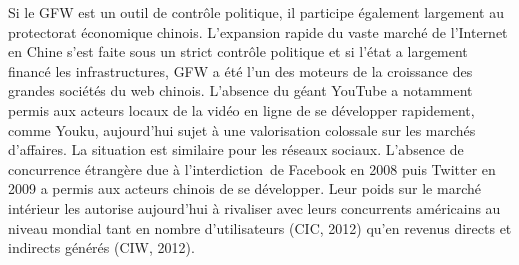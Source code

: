 \bigskip

{\color{black}
Si le GFW est un outil de contr\^ole politique, il participe \'egalement largement au protectorat \'economique chinois.
L'expansion rapide du vaste march\'e de l'Internet en Chine s'est faite sous un strict contr\^ole politique et si
l'\'etat a largement financ\'e les infrastructures, GFW a \'et\'e l'un des moteurs de la croissance des grandes
soci\'et\'es du web chinois. L'absence du g\'eant YouTube a notamment permis aux acteurs locaux de la vid\'eo en ligne
de se d\'evelopper rapidement, comme Youku, aujourd'hui sujet \`a une valorisation colossale sur les march\'es
d'affaires. La situation est similaire pour les r\'eseaux sociaux. L'absence de concurrence \'etrang\`ere due \`a
l'interdiction~de Facebook en 2008 puis Twitter en 2009 a permis aux acteurs chinois de se d\'evelopper. Leur poids sur
le march\'e int\'erieur les autorise aujourd'hui \`a rivaliser avec leurs concurrents am\'ericains au niveau mondial
tant en nombre d'utilisateurs (CIC, 2012) qu'en revenus directs et indirects g\'en\'er\'es (CIW, 2012).}


\bigskip

